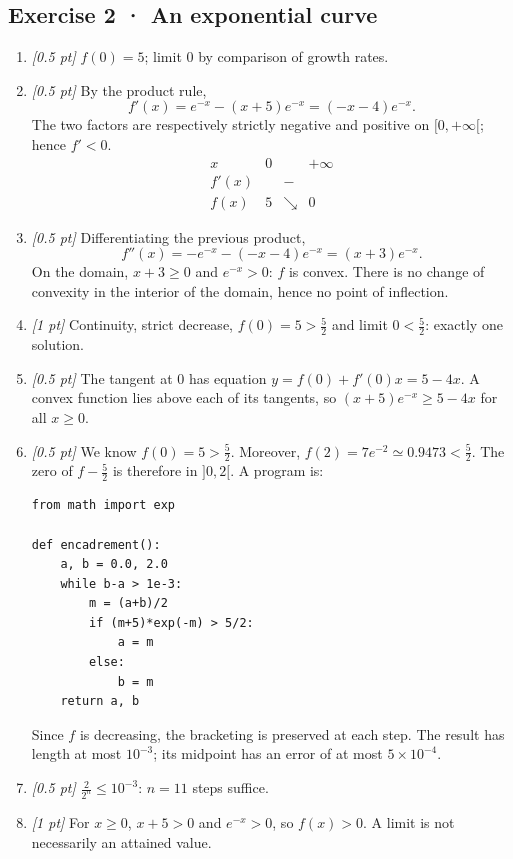 \subsection*{Exercise 2 · An exponential curve}\begin{enumerate}

\item \textit{[0.5 pt]} $f(0)=5$; limit $0$ by comparison of growth rates.

\item \textit{[0.5 pt]} By the product rule,
\[f'(x)=e^{-x}-(x+5)e^{-x}=(-x-4)e^{-x}.\]
The two factors are respectively strictly negative and positive on $[0,+\infty[$; hence $f'<0$.
\[\begin{array}{c|ccc}x&0&&+\infty\\\hline f'(x)&&-&\\\hline f(x)&5&\searrow&0\end{array}\]

\item \textit{[0.5 pt]} Differentiating the previous product,
\[f''(x)=-e^{-x}-(-x-4)e^{-x}=(x+3)e^{-x}.\]
On the domain, $x+3\ge0$ and $e^{-x}>0$: $f$ is convex. There is no change of convexity in the interior of the domain, hence no point of inflection.

\item \textit{[1 pt]} Continuity, strict decrease, $f(0)=5>\frac{5}{2}$ and limit $0<\frac{5}{2}$: exactly one solution.

\item \textit{[0.5 pt]} The tangent at $0$ has equation $y=f(0)+f'(0)x=5-4x$. A convex function lies above each of its tangents, so $(x+5)e^{-x}\ge 5-4x$ for all $x\ge0$.


\item \textit{[0.5 pt]} We know $f(0)=5>\frac{5}{2}$. Moreover, $f(2)=7e^{-2}\simeq\num{0,9473}<\frac{5}{2}$. The zero of $f-\frac{5}{2}$ is therefore in $]0,2[$. A program is:
\begin{lstlisting}
from math import exp

def encadrement():
    a, b = 0.0, 2.0
    while b-a > 1e-3:
        m = (a+b)/2
        if (m+5)*exp(-m) > 5/2:
            a = m
        else:
            b = m
    return a, b
\end{lstlisting}
Since $f$ is decreasing, the bracketing is preserved at each step. The result has length at most $10^{-3}$; its midpoint has an error of at most $5\times10^{-4}$.

\item \textit{[0.5 pt]} $\frac{2}{2^n}\le10^{-3}$: $n=11$ steps suffice.

\item \textit{[1 pt]} For $x\ge0$, $x+5>0$ and $e^{-x}>0$, so $f(x)>0$. A limit is not necessarily an attained value.

\end{enumerate}

